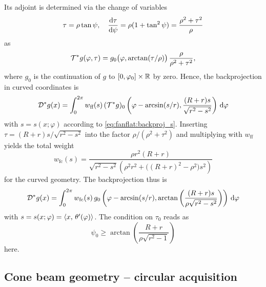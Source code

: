 \documentclass{amsart}
\renewcommand*{\phi}{\varphi}
\begin{document}
%
Its adjoint is determined via the change of variables
%
\begin{equation*}
 \tau = \rho\tan\psi,\quad \frac{\mathrm{d}\tau}{\mathrm{d}\psi} = \rho (1 + \tan^2\psi) = \frac{\rho^2 + \tau^2}{\rho}
\end{equation*}
%
as
%
\begin{equation}
 \label{eq:fancurved:coord_op_adjoint}
 \OPT^* g(\phi, \tau) = g_0\big(\phi, \arctan(\tau/\rho)\big)\, \frac{\rho}{\rho^2 + \tau^2},
\end{equation} 
%
where $g_0$ is the continuation of $g$ to $[0,\phi_0] \times \RR$ by zero. Hence, the backprojection in curved coordinates is
%
\begin{equation*}
 \OPD^*g(x) = \int_0^{2\pi} w_{\text{ff}}(s)\, (\OPT^*g)_0\left( \phi - \arcsin(s/r), 
 \frac{(R+r)s}{\sqrt{r^2-s^2}} \right)\, \D\phi
\end{equation*}
%
with $s = s(x; \phi)$ according to \eqref{eq:fanflat:backproj_s}. Inserting $\tau = (R+r)s/\sqrt{r^2-s^2}$ into the factor 
$\rho/(\rho^2+\tau^2)$ and multiplying with $w_{\text{ff}}$ yields the total weight 
%
\begin{equation}
 \label{eq:fancurved:backproj_weight}
 w_{\text{fc}}(s) = \frac{\rho r^2(R+r)}{\sqrt{r^2-s^2}\left( \rho^2 r^2 + \big((R+r)^2 - \rho^2\big) s^2 \right)}
\end{equation}
%
for the curved geometry. The backprojection thus is
%
\begin{equation}
 \label{eq:fancurved:backproj}
 \OPD^*g(x) = \int_0^{2\pi} w_{\text{fc}}(s)\, g_0\left( \phi - \arcsin(s/r), 
 \arctan \left(\frac{(R+r)s}{\rho\sqrt{r^2-s^2}} \right) \right)\, \D\phi
\end{equation} 
%
with $s = s(x; \phi) = \INNER{x}{\theta'(\phi)}$. The condition on $\tau_0$ reads as
%
\begin{equation}
 \label{eq:fancurved:condition_det_width}
 \psi_0 \geq \arctan\left( \frac{R+r}{\rho\sqrt{r^2-1}} \right)
\end{equation}
%
here.
\vspace{5ex}%






\subsection{Cone beam geometry -- circular acquisition}
\label{sec:applications:cone_circular}
\end{document}
